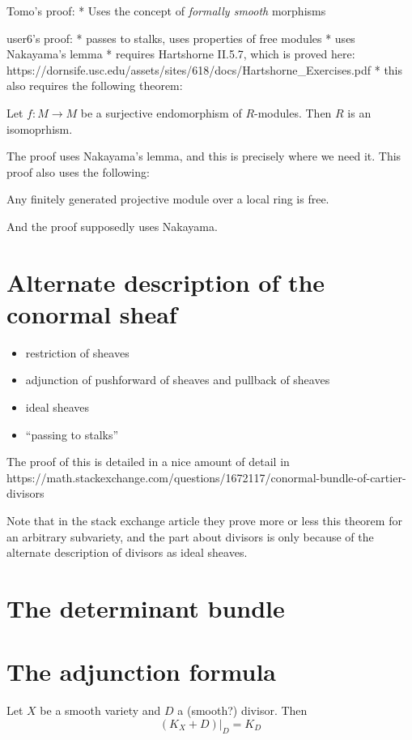 Tomo's proof:
* Uses the concept of \textit{formally smooth} morphisms

user6's proof:
* passes to stalks, uses properties of free modules
* uses Nakayama's lemma
* requires Hartshorne II.5.7, which is proved here:
https://dornsife.usc.edu/assets/sites/618/docs/Hartshorne\_Exercises.pdf
* this also requires the following theorem:
\begin{thm}
	Let \(f: M \to M\) be a surjective endomorphism of \(R\)-modules.
	Then \(R\) is an isomoprhism.
\end{thm}
The proof uses Nakayama's lemma, and this is precisely where we need it.
This proof also uses the following:
\begin{thm}
	Any finitely generated projective module over a local ring
	is free.
\end{thm}
And the proof supposedly uses Nakayama.






\section{Alternate description of the conormal sheaf}

\begin{itemize}
	\item restriction of sheaves
	\item adjunction of pushforward of sheaves and pullback of sheaves
	\item ideal sheaves
	\item ``passing to stalks''
\end{itemize}

The proof of this is detailed in a nice amount of detail in
https://math.stackexchange.com/questions/1672117/conormal-bundle-of-cartier-divisors

Note that in the stack exchange article they prove more or less this 
theorem for an arbitrary subvariety, and the part about divisors
is only because of the alternate description of divisors as ideal sheaves.

\section{The determinant bundle}


\section{The adjunction formula}


\begin{thm}
	Let \(X\) be a smooth variety and \(D\) a
	(smooth?) divisor. 
	Then 
	\[
		(K_{X} + D)|_{D} = K_{D}
	\] 
	
\end{thm}

